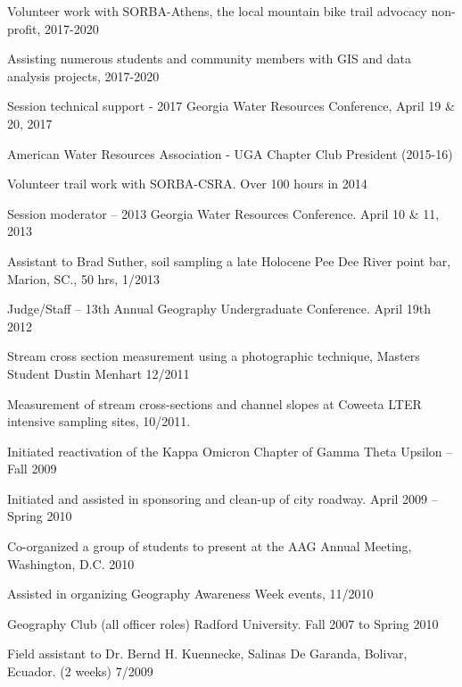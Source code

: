 \documentclass[10pt,letterpaper]{article}
\begin{document}
	\begin{itemize*}
		
		\item
		Volunteer work with SORBA-Athens, the local mountain bike trail advocacy non-profit, 2017-2020
		\item
		Assisting numerous students and community members with GIS and data analysis projects, 2017-2020
		\item
		Session technical support - 2017 Georgia Water Resources Conference, April 19 \& 20, 2017
		\item
		American Water Resources Association - UGA Chapter Club President (2015-16)
		\item
		Volunteer trail work with SORBA-CSRA. Over 100 hours in 2014
		\item
		Session moderator – 2013 Georgia Water Resources Conference. April 10 \& 11, 2013
		\item
		Assistant to Brad Suther, soil sampling a late Holocene Pee Dee River point bar, Marion, SC., 50 hrs, 1/2013
		\item
		Judge/Staff – 13th Annual Geography Undergraduate Conference. April 19th 2012
		\item
		Stream cross section measurement using a photographic technique, Masters Student Dustin Menhart 12/2011
		\item 
		Measurement of stream cross-sections and channel slopes at Coweeta LTER intensive sampling sites, 10/2011.
		\item 
		Initiated reactivation of the Kappa Omicron Chapter of Gamma Theta Upsilon – Fall 2009
		\item 
		Initiated and assisted in sponsoring and clean-up of city roadway. April 2009 – Spring 2010
		\item 
		Co-organized a group of students to present at the AAG Annual Meeting, Washington, D.C. 2010
		\item 
		Assisted in organizing Geography Awareness Week events, 11/2010
		\item 
		Geography Club (all officer roles) Radford University. Fall 2007 to Spring 2010
		\item 
		Field assistant to Dr. Bernd H. Kuennecke, Salinas De Garanda, Bolivar, Ecuador. (2 weeks) 7/2009
		
		
	\end{itemize*}
	
	\endgroup
	
\end{document}

